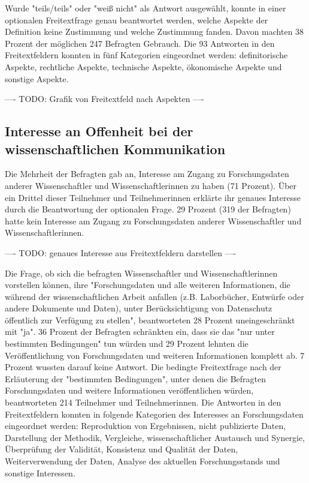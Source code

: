Wurde "teils/teils" oder "weiß nicht" als Antwort ausgewählt, konnte in einer optionalen Freitextfrage genau beantwortet werden, welche Aspekte der Definition keine Zustimmung und welche Zustimmung fanden. Davon machten 38 Prozent der möglichen 247 Befragten Gebrauch. Die 93 Antworten in den Freitextfeldern konnten in fünf Kategorien eingeordnet werden: definitorische Aspekte, rechtliche Aspekte, technische Aspekte, ökonomische Aspekte und sonstige Aspekte.

---- TODO: Grafik von Freitextfeld nach Aspekten ----

\subsection{Interesse an Offenheit bei der wissenschaftlichen Kommunikation}

Die Mehrheit der Befragten gab an, Interesse am Zugang zu Forschungsdaten anderer Wissenschaftler und Wissenschaftlerinnen zu haben (71 Prozent). Über ein Drittel dieser Teilnehmer und Teilnehmerinnen erklärte ihr genaues Interesse durch die Beantwortung der optionalen Frage. 29 Prozent (319 der Befragten) hatte kein Interesse am Zugang zu Forschungsdaten anderer Wissenschaftler und Wissenschaftlerinnen.

---- TODO: genaues Interesse aus Freitextfeldern darstellen ----

Die Frage, ob sich die befragten Wissenschaftler und Wissenschaftlerinnen vorstellen können, ihre "Forschungsdaten und alle weiteren Informationen, die während der wissenschaftlichen Arbeit anfallen (z.B. Laborbücher, Entwürfe oder andere Dokumente und Daten), unter Berücksichtigung von Datenschutz öffentlich zur Verfügung zu stellen", beantworteten 28 Prozent uneingeschränkt mit "ja". 36 Prozent der Befragten schränkten ein, dass sie das "nur unter bestimmten Bedingungen" tun würden und 29 Prozent lehnten die Veröffentlichung von Forschungsdaten und weiteren Informationen komplett ab. 7 Prozent wussten darauf keine Antwort. Die bedingte Freitextfrage nach der Erläuterung der "bestimmten Bedingungen", unter denen die Befragten Forschungsdaten und weitere Informationen veröffentlichen würden, beantworteten 214 Teilnehmer und Teilnehmerinnen. Die Antworten in den Freitextfeldern konnten in folgende Kategorien des Interesses an Forschungsdaten eingeordnet werden: Reproduktion von Ergebnissen, nicht publizierte Daten, Darstellung der Methodik, Vergleiche, wissenschaftlicher Austausch und Synergie, Überprüfung der Validität, Konsistenz und Qualität der Daten, Weiterverwendung der Daten, Analyse des aktuellen Forschungsstands und sonstige Interessen.

